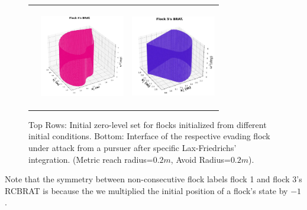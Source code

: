 \begin{figure}[tb!]
\begin{tabular}{ccc}
		&
		\includegraphics[height=12em,width=10em]{figures/flock_4_final.jpg} 
		& 		
		\includegraphics[height=12em,width=10em]{figures/flock_5_final.jpg}	
	\end{tabular}
\caption{\footnotesize Top Rows: Initial zero-level set for flocks initialized from different initial conditions.  Bottom: Interface of the respective evading flock under attack from a pursuer after specific Lax-Friedrichs' integration.   (Metric reach radius=$0.2m$, Avoid Radius=$0.2m$).} 
\label{fig:rcbrats}
\end{figure}

Note that the symmetry between non-consecutive flock labels \eg flock 1 and flock 3's RCBRAT is because the we multiplied the initial position of a flock's state by $-1$.
